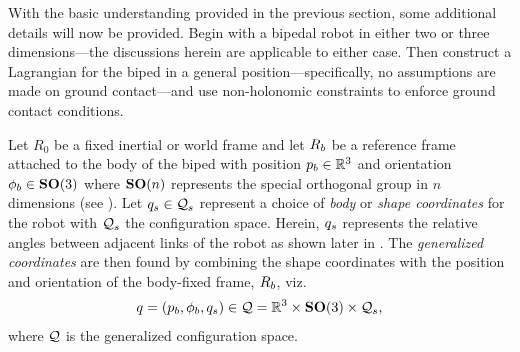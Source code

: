 %
%

With the basic understanding provided in the previous section, some additional
details will now be provided.
%
Begin with a bipedal robot in either two or three dimensions---the discussions
herein are applicable to either case.
%
Then construct a Lagrangian for the biped in a general position---specifically,
no assumptions are made on ground contact---and use non-holonomic constraints to
enforce ground contact conditions.

Let $R_{0}$ be a fixed inertial or world frame and let $R_{b}$ be a reference
frame attached to the body of the biped with position $p_{b} \in \mathbb{R}^{3}$ and
orientation $\phi_{b} \in \mathbf{SO}(3)$ where $\mathbf{SO}(n)$ represents the special
orthogonal group in $n$ dimensions (see \cite{Conway1985}).
%
Let $q_{s} \in \mathcal{Q}_{s}$ represent a choice of {\em body} or {\em shape
  coordinates} for the robot with $\mathcal{Q}_{s}$ the configuration space.
%
Herein, $q_{s}$ represents the relative angles between adjacent links of the
robot as shown later in .
%
The {\em generalized coordinates} are then found by combining the shape
coordinates with the position and orientation of the body-fixed frame, $R_{b}$,
viz.
%
\begin{align*}
  q = (p_{b}, \phi_{b}, q_{s}) \in \mathcal{Q} = \mathbb{R}^{3} \times \mathbf{SO}(3)
  \times \mathcal{Q}_{s},
\end{align*}
%
where $\mathcal{Q}$ is the generalized configuration space.

